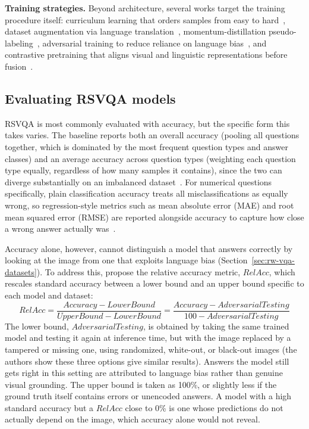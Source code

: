 \textbf{Training strategies.} Beyond architecture, several works target the training procedure itself: curriculum learning that orders samples from easy to hard~\cite{yuan2022acurriculum}, dataset augmentation via language translation~\cite{yuan2023amultilingual}, momentum-distillation pseudo-labeling~\cite{li2024rsmodm}, adversarial training to reduce reliance on language bias~\cite{yuan2023badversarial}, and contrastive pretraining that aligns visual and linguistic representations before fusion~\cite{tian2024amvqa}.

\subsection{Evaluating RSVQA models}
\label{sec:rw-vqa-metrics}

RSVQA is most commonly evaluated with accuracy, but the specific form this takes varies. The baseline reports both an overall accuracy (pooling all questions together, which is dominated by the most frequent question types and answer classes) and an average accuracy across question types (weighting each question type equally, regardless of how many samples it contains), since the two can diverge substantially on an imbalanced dataset~\cite{lobry2020rsvqa}. For numerical questions specifically, plain classification accuracy treats all misclassifications as equally wrong, so regression-style metrics such as mean absolute error (MAE) and root mean squared error (RMSE) are reported alongside accuracy to capture how close a wrong answer actually was~\cite{lobry2020rsvqa}.

Accuracy alone, however, cannot distinguish a model that answers correctly by looking at the image from one that exploits language bias (Section~\ref{sec:rw-vqa-datasets}). To address this, \textcite{chappuis2025langbias} propose the relative accuracy metric, $RelAcc$, which rescales standard accuracy between a lower bound and an upper bound specific to each model and dataset:
\begin{equation}
RelAcc = \frac{Accuracy - LowerBound}{UpperBound - LowerBound} = \frac{Accuracy - AdversarialTesting}{100 - AdversarialTesting}
\end{equation}
The lower bound, $AdversarialTesting$, is obtained by taking the same trained model and testing it again at inference time, but with the image replaced by a tampered or missing one, using randomized, white-out, or black-out images (the authors show these three options give similar results). Answers the model still gets right in this setting are attributed to language bias rather than genuine visual grounding. The upper bound is taken as 100\%, or slightly less if the ground truth itself contains errors or unencoded answers. A model with a high standard accuracy but a $RelAcc$ close to 0\% is one whose predictions do not actually depend on the image, which accuracy alone would not reveal.

